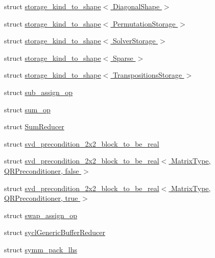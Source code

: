 \begin{DoxyCompactItemize}
\item 
struct \hyperlink{struct_eigen_1_1internal_1_1storage__kind__to__shape_3_01_diagonal_shape_01_4}{storage\+\_\+kind\+\_\+to\+\_\+shape$<$ Diagonal\+Shape $>$}
\item 
struct \hyperlink{struct_eigen_1_1internal_1_1storage__kind__to__shape_3_01_permutation_storage_01_4}{storage\+\_\+kind\+\_\+to\+\_\+shape$<$ Permutation\+Storage $>$}
\item 
struct \hyperlink{struct_eigen_1_1internal_1_1storage__kind__to__shape_3_01_solver_storage_01_4}{storage\+\_\+kind\+\_\+to\+\_\+shape$<$ Solver\+Storage $>$}
\item 
struct \hyperlink{struct_eigen_1_1internal_1_1storage__kind__to__shape_3_01_sparse_01_4}{storage\+\_\+kind\+\_\+to\+\_\+shape$<$ Sparse $>$}
\item 
struct \hyperlink{struct_eigen_1_1internal_1_1storage__kind__to__shape_3_01_transpositions_storage_01_4}{storage\+\_\+kind\+\_\+to\+\_\+shape$<$ Transpositions\+Storage $>$}
\item 
struct \hyperlink{struct_eigen_1_1internal_1_1sub__assign__op}{sub\+\_\+assign\+\_\+op}
\item 
struct \hyperlink{struct_eigen_1_1internal_1_1sum__op}{sum\+\_\+op}
\item 
struct \hyperlink{struct_eigen_1_1internal_1_1_sum_reducer}{Sum\+Reducer}
\item 
struct \hyperlink{struct_eigen_1_1internal_1_1svd__precondition__2x2__block__to__be__real}{svd\+\_\+precondition\+\_\+2x2\+\_\+block\+\_\+to\+\_\+be\+\_\+real}
\item 
struct \hyperlink{struct_eigen_1_1internal_1_1svd__precondition__2x2__block__to__be__real_3_01_matrix_type_00_01_q076cf26720930d18ea7d222bbee662fd}{svd\+\_\+precondition\+\_\+2x2\+\_\+block\+\_\+to\+\_\+be\+\_\+real$<$ Matrix\+Type, Q\+R\+Preconditioner, false $>$}
\item 
struct \hyperlink{struct_eigen_1_1internal_1_1svd__precondition__2x2__block__to__be__real_3_01_matrix_type_00_01_qb58fa819a3391e7d55d98ccdc14db9e4}{svd\+\_\+precondition\+\_\+2x2\+\_\+block\+\_\+to\+\_\+be\+\_\+real$<$ Matrix\+Type, Q\+R\+Preconditioner, true $>$}
\item 
struct \hyperlink{struct_eigen_1_1internal_1_1swap__assign__op}{swap\+\_\+assign\+\_\+op}
\item 
struct \hyperlink{struct_eigen_1_1internal_1_1sycl_generic_buffer_reducer}{sycl\+Generic\+Buffer\+Reducer}
\item 
struct \hyperlink{struct_eigen_1_1internal_1_1symm__pack__lhs}{symm\+\_\+pack\+\_\+lhs}

\end{DoxyCompactItemize}
